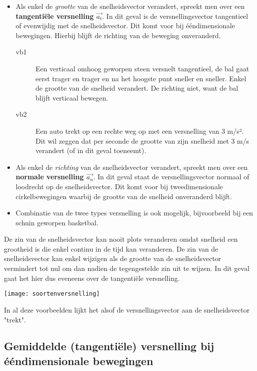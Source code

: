 \documentclass{ximera}
\begin{document}
\begin{itemize}
    \item Als enkel de \textit{grootte} van de snelheidsvector verandert, spreekt men over een \textbf{tangentiële versnelling \(\vec{a_t}\)}. In dit geval is de versnellingsvector tangentieel of evenwijdig met de snelheidsvector. Dit komt voor bij ééndimensionale bewegingen. Hierbij blijft de richting van de beweging onveranderd.
		\begin{description}
			\item[vb1] Een verticaal omhoog geworpen steen versnelt tangentieel, de bal gaat eerst trager en trager en na het hoogste punt sneller en sneller. Enkel de grootte van de snelheid verandert. De richting niet, want de bal blijft verticaal bewegen.
			\item[vb2] Een auto trekt op een rechte weg op met een versnelling van 3 m/s². Dit wil zeggen dat per seconde de grootte van zijn snelheid met 3 m/s verandert (of in dit geval toeneemt).
		\end{description}
    \item Als enkel de \textit{richting} van de snelheidsvector verandert, spreekt men over een \textbf{normale versnelling \(\vec{a_n}\)}. In dit geval staat de versnellingsvector normaal of loodrecht op de snelheidsvector. Dit komt voor bij tweedimensionale cirkelbewegingen waarbij de grootte van de snelheid onveranderd blijft.
    \item Combinatie van de twee types versnelling is ook mogelijk, bijvoorbeeld bij een schuin geworpen basketbal.
\end{itemize}

\begin{remark}
	De zin van de snelheidsvector kan nooit plots veranderen omdat snelheid een grootheid is die enkel continu in de tijd kan veranderen. De zin van de snelheidsvector kan enkel wijzigen als de grootte van de snelheidsvector vermindert tot nul om dan nadien de tegengestelde zin uit te wijzen. In dit geval gaat het hier dus eveneens over de tangentiële versnelling.
\end{remark}

\begin{image}
\texttt{[image: soortenversnelling]}
\end{image}

In al deze voorbeelden lijkt het alsof de versnellingsvector aan de snelheidsvector "trekt".

\subsection*{Gemiddelde (tangentiële) versnelling bij ééndimensionale bewegingen}
\end{document}
